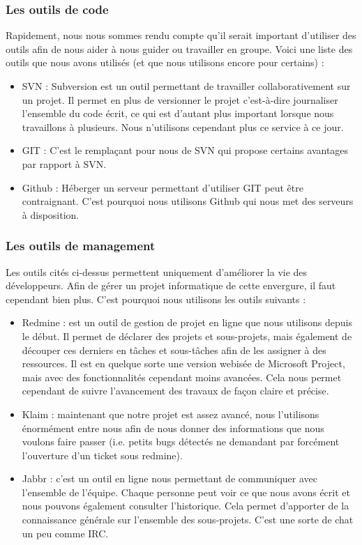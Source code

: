 \documentclass{article}
\begin{document}
		\subsubsection{Les outils de code}
		Rapidement, nous nous sommes rendu compte qu'il serait important d'utiliser des outils afin de nous aider à nous guider ou travailler en groupe. Voici une liste des outils que nous avons utilisés (et que nous utilisons encore pour certains) :
			\begin{itemize}
				\item SVN : Subversion est un outil permettant de travailler collaborativement sur un projet. Il permet en plus de versionner le projet c'est-à-dire journaliser l'ensemble du code écrit, ce qui est d'autant plus important lorsque nous travaillons à plusieurs. Nous n'utilisons cependant plus ce service à ce jour.
				\item GIT : C'est le remplaçant pour nous de SVN qui propose certains avantages par rapport à SVN.
				\item Github : Héberger un serveur permettant d'utiliser GIT peut être contraignant. C'est pourquoi nous utilisons Github qui nous met des serveurs à disposition.
			\end{itemize}
		
\subsubsection{Les outils de management}
		Les outils cités ci-dessus permettent uniquement d'améliorer la vie des développeurs. Afin de gérer un projet informatique de cette envergure, il faut cependant bien plus. C'est pourquoi nous utilisons les outils suivants : 
		\begin{itemize}
			\item Redmine : est un outil de gestion de projet en ligne que nous utilisons depuis le début. Il permet de déclarer des projets et sous-projets, mais également de découper ces derniers en tâches et sous-tâches afin de les assigner à des ressources. Il est en quelque sorte une version webisée de Microsoft Project, mais avec des fonctionnalités cependant moins avancées. Cela nous permet cependant de suivre l'avancement des travaux de façon claire et précise.
			\item Klaim : maintenant que notre projet est assez avancé, nous l'utilisons énormément entre nous afin de nous donner des informations que nous voulons faire passer (i.e. petits bugs détectés ne demandant par forcément l'ouverture d'un ticket sous redmine).
			\item Jabbr : c'est un outil en ligne nous permettant de communiquer avec l'ensemble de l'équipe. Chaque personne peut voir ce que nous avons écrit et nous pouvons également consulter l'historique. Cela permet d'apporter de la connaissance générale sur l'ensemble des sous-projets. C'est une sorte de chat un peu comme IRC.
		\end{itemize}
\end{document}

